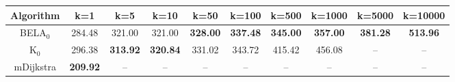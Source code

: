 \begin{tabular}{c|ccccccccc}\toprule
Algorithm & k=1 & k=5 & k=10 & k=50 & k=100 & k=500 & k=1000 & k=5000 & k=10000 \\ \midrule
BELA$_0$ & 284.48 & 321.00 & 321.00 & \textbf{328.00} & \textbf{337.48} & \textbf{345.00} & \textbf{357.00} & \textbf{381.28} & \textbf{513.96} \\
K$_0$ & 296.38 & \textbf{313.92} & \textbf{320.84} & 331.02 & 343.72 & 415.42 & 456.08 & -- & -- \\
mDijkstra & \textbf{209.92} & -- & -- & -- & -- & -- & -- & -- & -- \\ \bottomrule 
\end{tabular}
